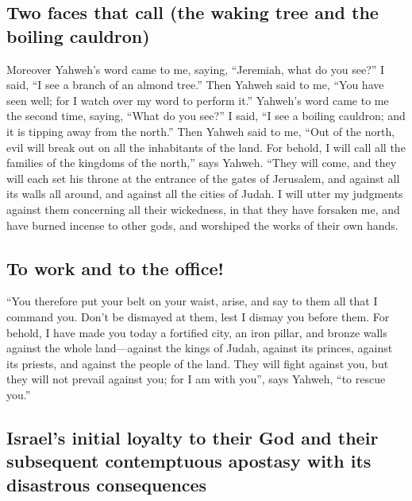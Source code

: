 \hypertarget{two-faces-that-call-the-waking-tree-and-the-boiling-cauldron}{%
\subsection{Two faces that call (the waking tree and the boiling
cauldron)}\label{two-faces-that-call-the-waking-tree-and-the-boiling-cauldron}}

 Moreover Yahweh's word came to me, saying, ``Jeremiah,
what do you see?'' I said, ``I see a branch of an almond tree.''
 Then Yahweh said to me, ``You have seen well; for I
watch over my word to perform it.''  Yahweh's word came
to me the second time, saying, ``What do you see?'' I said, ``I see a
boiling cauldron; and it is tipping away from the north.''
 Then Yahweh said to me, ``Out of the north, evil will
break out on all the inhabitants of the land.  For
behold, I will call all the families of the kingdoms of the north,''
says Yahweh. ``They will come, and they will each set his throne at the
entrance of the gates of Jerusalem, and against all its walls all
around, and against all the cities of Judah.  I will
utter my judgments against them concerning all their wickedness, in that
they have forsaken me, and have burned incense to other gods, and
worshiped the works of their own hands.

\hypertarget{to-work-and-to-the-office}{%
\subsection{To work and to the
office!}\label{to-work-and-to-the-office}}

 ``You therefore put your belt on your waist, arise, and
say to them all that I command you. Don't be dismayed at them, lest I
dismay you before them.  For behold, I have made you
today a fortified city, an iron pillar, and bronze walls against the
whole land---against the kings of Judah, against its princes, against
its priests, and against the people of the land.  They
will fight against you, but they will not prevail against you; for I am
with you'', says Yahweh, ``to rescue you.''

\hypertarget{israels-initial-loyalty-to-their-god-and-their-subsequent-contemptuous-apostasy-with-its-disastrous-consequences}{%
\subsection{Israel's initial loyalty to their God and their subsequent
contemptuous apostasy with its disastrous
consequences}\label{israels-initial-loyalty-to-their-god-and-their-subsequent-contemptuous-apostasy-with-its-disastrous-consequences}}


